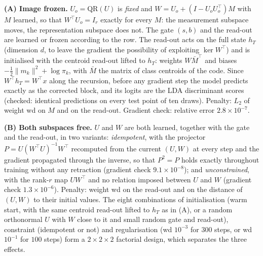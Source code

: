 \documentclass[11pt,a4paper]{article}
\theoremstyle{plain}
\theoremstyle{definition}
\theoremstyle{remark}
\newcommand{\T}{\top}
\begin{document}
\textbf{(A) Image frozen.} $U_o=\mathrm{QR}(U)$ is \emph{fixed} and
$W=U_o+(I-U_oU_o^\T)M$ with $M$ learned, so that $W^\T U_o=I_r$ exactly for
every $M$: the measurement subspace moves, the representation subspace
does not. The gate $(s,b)$ and the read-out are learned or frozen according
to the row. The read-out acts on the full state $h_T$ (dimension $d$, to
leave the gradient the possibility of exploiting $\ker W^\T$) and is
initialised with the centroid read-out lifted to $h_T$: weights $W\bar M^\T$
and biases $-\tfrac12\|m_k\|^2+\log\pi_k$, with $\bar M$ the matrix of class
centroids of the code. Since $W^\T h_T=W^\T x$ along the recursion, before
any gradient step the model predicts exactly as the corrected block, and its
logits are the LDA discriminant scores (checked: identical predictions on
every test point of ten draws). Penalty: $L_2$ of weight wd on $M$ and on
the read-out. Gradient check: relative error $2.8\times10^{-7}$.

\textbf{(B) Both subspaces free.} $U$ and $W$ are both learned, together
with the gate and the read-out, in two variants: \emph{idempotent}, with
the projector $P=U(W^\T U)^{-1}W^\T$ recomputed from the current $(U,W)$ at
every step and the gradient propagated through the inverse, so that $P^2=P$
holds exactly throughout training without any retraction (gradient check
$9.1\times10^{-8}$); and \emph{unconstrained}, with the rank-$r$ map
$UW^\T$ and no relation imposed between $U$ and $W$ (gradient check
$1.3\times10^{-6}$). Penalty: weight wd on the read-out and on the distance
of $(U,W)$ to their initial values. The eight combinations of
initialisation (warm start, with the same centroid read-out lifted to $h_T$
as in (A), or a random orthonormal $U$ with $W$ close to it and small random
gate and read-out), constraint (idempotent or not) and
regularisation (wd $10^{-3}$ for $300$ steps, or wd $10^{-1}$ for $100$
steps) form a $2\times2\times2$ factorial design, which separates the three
effects.
\end{document}
